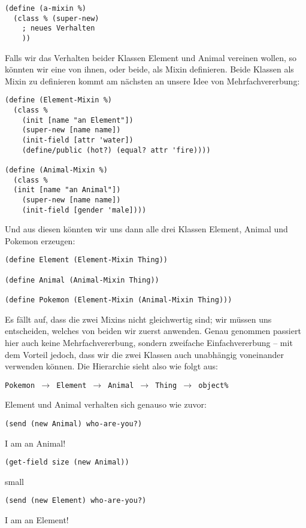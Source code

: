 \begin{lstlisting}
(define (a-mixin %)
  (class % (super-new)
    ; neues Verhalten
    ))
\end{lstlisting}

Falls wir das Verhalten beider Klassen Element und Animal vereinen wollen, so könnten wir eine von ihnen, oder beide, als Mixin definieren. Beide Klassen als Mixin zu definieren kommt am nächsten an unsere Idee von Mehrfachvererbung:

\begin{lstlisting}
(define (Element-Mixin %)
  (class % 
    (init [name "an Element"])
    (super-new [name name])
    (init-field [attr 'water])
    (define/public (hot?) (equal? attr 'fire))))

(define (Animal-Mixin %)
  (class %
  (init [name "an Animal"])
    (super-new [name name])
    (init-field [gender 'male])))
\end{lstlisting}

Und aus diesen könnten wir uns dann alle drei Klassen Element, Animal und Pokemon erzeugen:
\begin{lstlisting}
(define Element (Element-Mixin Thing))

(define Animal (Animal-Mixin Thing))
 
(define Pokemon (Element-Mixin (Animal-Mixin Thing)))
\end{lstlisting}

Es fällt auf, dass die zwei Mixins nicht gleichwertig sind; wir müssen uns entscheiden, welches von beiden wir zuerst anwenden. Genau genommen passiert hier auch keine Mehrfachvererbung, sondern zweifache Einfachvererbung -- mit dem Vorteil jedoch, dass wir die zwei Klassen auch unabhängig voneinander verwenden können. Die Hierarchie sieht also wie folgt aus:

\texttt{Pokemon $\rightarrow$ Element $\rightarrow$ Animal $\rightarrow$ Thing $\rightarrow$ object\%}

Element und Animal verhalten sich genauso wie zuvor:

\begin{lstlisting}
(send (new Animal) who-are-you?)
\end{lstlisting}
{\routput {\qq}I am an Animal!\qq}

\begin{lstlisting}
(get-field size (new Animal))
\end{lstlisting}
{\rsymbol small}

\begin{lstlisting}
(send (new Element) who-are-you?)
\end{lstlisting}
{\routput {\qq}I am an Element!\qq}

